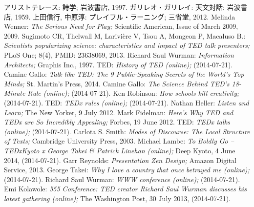 \documentclass[submit,techreq,jkeyword,noauthor]{ipsj}
\begin{document}
\begin{thebibliography}{10}
 アリストテレース: 詩学; 岩波書店, 1997.
 ガリレオ・ガリレイ: 天文対話; 岩波書店, 1959.
 上田信行, 中原淳: プレイフル・ラーニング; 三省堂, 2012.
 Melinda Wenner: \textit{The Serious Need for Play;} Scientific American, Issue of March 2009, 2009.
 Sugimoto CR, Thelwall M, Larivière V, Tsou A, Mongeon P, Macaluso B.: \textit{Scientists popularizing science: characteristics and impact of TED talk presenters;} PLoS One; 8(4), PMID: 23638069, 2013. 
 Richard Saul Wurman: \textit{Information Architects;} Graphis Inc., 1997.
 TED: \textit{History of TED (online);}  (2014-07-21).
 Camine Gallo: \textit{Talk like TED: The 9 Public-Speaking Secrets of the World's Top Minds;} St. Martin's Press, 2014.
 Camine Gallo: \textit{The Science Behind TED's 18-Minute Rule (online);}  (2014-07-21).
 Ken Robinson: \textit{How schools kill creativity;}  (2014-07-21).
 TED: \textit{TEDx rules (online);}  (2014-07-21).
 Nathan Heller: \textit{Listen and Learn;} The New Yorker, 9 July 2012.
 Mark Fidelman: \textit{Here's Why TED and TEDx are So Incredibly Appealing;} Forbes, 19 June 2012.
 TED: \textit{TEDx talks  (online);}  (2014-07-21).
 Carlota S. Smith: \textit{Modes of Discourse: The Local Structure of Texts;} Cambridge University Press, 2003.
 Michael Lambe: \textit{To Boldly Go – TEDxKyoto x George Takei \& Patrick Linehan (online);} Deep Kyoto, 4 June 2014,  (2014-07-21).
 Garr Reynolds: \textit{Presentation Zen Design;} Amazon Digital Service, 2013.
 George Takei: \textit{Why I love a country that once betrayed me (online);}  (2014-07-21).
 Richard Saul Wurman: \textit{WWW conference (online);}  (2014-07-21).
 Emi Kolawole: \textit{555 Conference: TED creator Richard Saul Wurman discusses his latest gathering (online);} The Washington Post, 30 July 2013,  (2014-07-21).
\end{thebibliography}
\end{document}

